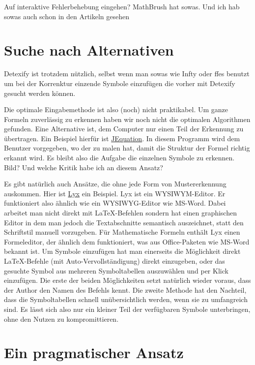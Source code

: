 \TODO Auf interaktive Fehlerbehebung eingehen? MathBrush hat sowas. Und ich hab sowas auch schon in den Artikeln gesehen


\section{Suche nach Alternativen}
\label{sec:alternativen}

\TODO Detexify ist trotzdem nützlich, selbst wenn man sowas wie Infty oder ffes benutzt um bei der Korrenktur einzende Symbole einzufügen die vorher mit Detexify gesucht werden können.

Die optimale Eingabemethode ist also (noch) nicht praktikabel. Um ganze Formeln zuverlässig zu erkennen haben wir noch nicht die optimalen Algorithmen gefunden. Eine Alternative ist, dem Computer nur einen Teil der Erkennung zu übertragen. Ein Beispiel hierfür ist \href{http://jequation.sourceforge.net/}{JEquation}. In diesem Programm wird dem Benutzer vorgegeben, wo der zu malen hat, damit die Struktur der Formel richtig erkannt wird. Es bleibt also die Aufgabe die einzelnen Symbole zu erkennen. \TODO Bild? Und welche Kritik habe ich an diesem Ansatz?

Es gibt natürlich auch Ansätze, die ohne jede Form von Mustererkennung auskommen. Hier ist \href{http://lyx.org}{Lyx} ein Beispiel. Lyx ist ein \ac{WYSIWYM}-Editor. Er funktioniert also ähnlich wie ein \ac{WYSIWYG}-Editor wie MS-Word. Dabei arbeitet man nicht direkt mit \LaTeX-Befehlen sondern hat einen graphischen Editor in dem man jedoch die Textabschnitte semantisch auszeichnet, statt den Schriftstil manuell vorzugeben. Für Mathematische Formeln enthält Lyx einen Formeleditor, der ähnlich dem funktioniert, was aus Office-Paketen wie MS-Word bekannt ist. Um Symbole einzufügen hat man einerseits die Möglichkeit direkt \LaTeX-Befehle (mit Auto-Vervollständigung) direkt einzugeben, oder das gesuchte Symbol aus mehreren Symboltabellen auszuwählen und per Klick einzufügen. Die erste der beiden Möglichkeiten setzt natürlich wieder voraus, dass der Author den Namen des Befehls kennt. Die zweite Methode hat den Nachteil, dass die Symboltabellen schnell unübersichtlich werden, wenn sie zu umfangreich sind. Es lässt sich also nur ein kleiner Teil der verfügbaren Symbole unterbringen, ohne den Nutzen zu kompromittieren.

\section{Ein pragmatischer Ansatz} %
\label{sec:pragmatisch}

